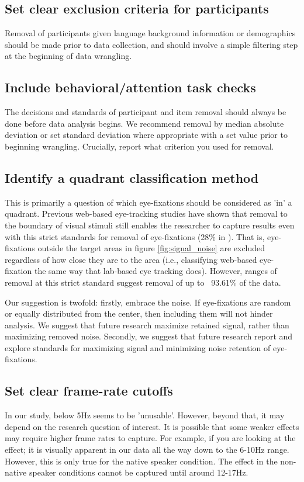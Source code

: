 \subsection{Set clear exclusion criteria for participants}

Removal of participants given language background information or demographics should be made prior to data collection, and should involve a simple filtering step at the beginning of data wrangling.

\subsection{Include behavioral/attention task checks}

The decisions and standards of participant and item removal should always be done before data analysis begins. We recommend removal by median absolute deviation \parencite{Leys_2013}or set standard deviation where appropriate with a set value prior to beginning wrangling. Crucially, report what criterion you used for removal. 

\subsection{Identify a quadrant classification method}
This is primarily a question of which eye-fixations should be considered as 'in' a quadrant. Previous web-based eye-tracking studies have shown that removal to the boundary of visual stimuli still enables the researcher to capture results even with this strict standards for removal of eye-fixations (28\% in \textcite{Vos_2017}). That is, eye-fixations outside the target areas in figure \ref{fig:signal_noise} are excluded regardless of how close they are to the area (i.e., classifying web-based eye-fixation the same way that lab-based eye tracking does). However, ranges of removal at this strict standard suggest removal of up to ~93.61\% of the data. 

Our suggestion is twofold: firstly, embrace the noise. If eye-fixations are random or equally distributed from the center, then including them will not hinder analysis. We suggest that future research maximize retained signal, rather than maximizing removed noise.  Secondly, we suggest that future research report and explore standards for maximizing signal and minimizing noise retention of eye-fixations. 


\subsection{Set clear frame-rate cutoffs}
In our study, below 5Hz seems to be 'unusable'. However, beyond that, it may depend on the research question of interest. It is possible that some weaker effects may require higher frame rates to capture. For example, if you are looking at the  effect; it is visually apparent in our data all the way down to the 6-10Hz range. However, this is only true for the native speaker condition. The effect in the non-native speaker conditions cannot be captured until around 12-17Hz. 

